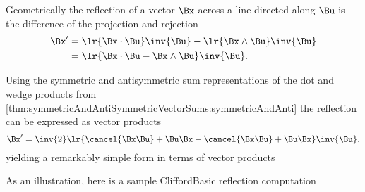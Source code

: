 %
%
Geometrically the reflection of a vector \( \Bx \) across a line directed along \( \Bu \) is the difference of the projection and rejection
\begin{equation}\label{eqn:reflection:900}
\begin{aligned}
\Bx'
&= \lr{ \Bx \cdot \Bu } \inv{\Bu} - \lr{ \Bx \wedge \Bu } \inv{\Bu } \\
&= \lr{ \Bx \cdot \Bu - \Bx \wedge \Bu } \inv{\Bu }.
\end{aligned}
\end{equation}

Using the symmetric and antisymmetric sum representations of the dot and wedge products from
\cref{thm:symmetricAndAntiSymmetricVectorSums:symmetricAndAnti}
the reflection can be expressed as vector products
\begin{equation}\label{eqn:reflection:940}
\Bx'
= \inv{2} \lr{ \cancel{\Bx \Bu} + \Bu \Bx - \cancel{\Bx \Bu} + \Bu \Bx } \inv{\Bu },
\end{equation}
yielding a remarkably simple form in terms of vector products

As an illustration, here is a sample CliffordBasic reflection computation


